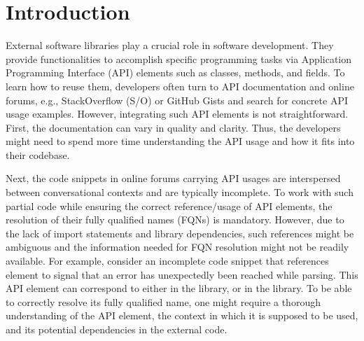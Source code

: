 \section{Introduction}
\label{sec:intro}

External software libraries play a crucial role in software development. They provide functionalities to accomplish specific programming tasks via Application Programming Interface (API) elements such as classes, methods, and fields. To learn how to reuse them, developers often turn to API documentation and online forums, e.g., StackOverflow (S/O) or GitHub Gists and search for concrete API usage examples. However, integrating such API elements is not straightforward. First, the documentation can vary in quality and clarity. Thus, the developers might need to spend more time understanding the API usage and how it fits into their codebase.

Next, the code snippets in online forums carrying API usages are interspersed between conversational contexts and are typically incomplete. To work with such partial code while ensuring the correct reference/usage of API elements, the resolution of their fully qualified names (FQNs) is mandatory.
However, due to the lack of import statements and library dependencies, such references might be ambiguous and the information needed for FQN resolution might not be readily available. For example, consider an incomplete code snippet that references  element to signal that an error has unexpectedly been reached while parsing. This API element can correspond to either  in the  library, or  in the  library. To be able to correctly resolve its fully qualified name, one might require a thorough understanding of the API element, the context in which it is supposed to be used, and its potential dependencies in the external code.


